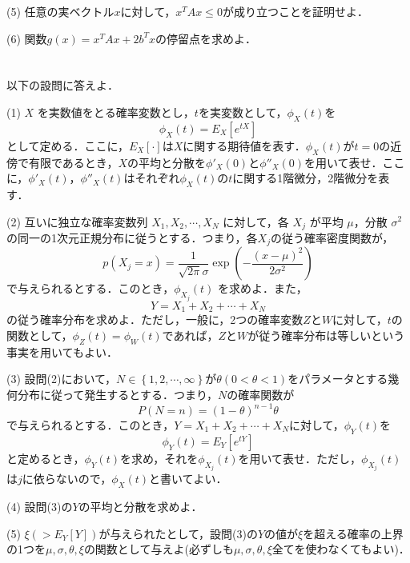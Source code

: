 \documentclass[a4j]{jarticle}
\begin{document}
\begin{screen}
 (5) 任意の実ベクトル$x$に対して，$x^TAx \leq 0$が成り立つことを証明せよ．
\end{screen}

\begin{screen}
 (6) 関数$g(x)=x^TAx + 2b^Tx$の停留点を求めよ．
\end{screen}

\section{}


\section{}

\begin{screen}
 以下の設問に答えよ．
\end{screen}

\begin{screen}
 (1) $X$ を実数値をとる確率変数とし，$t$を実変数として，$\phi_X(t)$を
 $$\phi_X(t) = E_X\left[e^{tX}\right]$$
 として定める．ここに，$E_X\left[\cdot\right]$は$X$に関する期待値を表す．$\phi_X(t)$が$t=0$の近傍で有限であるとき，$X$の平均と分散を$\phi'_X(0)$と$\phi''_X(0)$を用いて表せ．ここに，$\phi'_X(t)$，$\phi''_X(t)$はそれぞれ$\phi_X(t)$の$t$に関する1階微分，2階微分を表す．
\end{screen}

\begin{screen}
 (2) 互いに独立な確率変数列 $X_1,X_2,\cdots,X_N$ に対して，各 $X_j$ が平均 $\mu$，分散 $\sigma^2$ の同一の1次元正規分布に従うとする．つまり，各$X_j$の従う確率密度関数が，
 $$p(X_j=x) = \frac{1}{\sqrt{2 \pi}\sigma}\exp\left(- \frac{(x-\mu)^2}{2\sigma^2}\right)$$
 で与えられるとする．このとき，$\phi_{X_j}(t)$ を求めよ．また，
 $$ Y = X_1 + X_2 + \cdots + X_N$$
 の従う確率分布を求めよ．ただし，一般に，2つの確率変数$Z$と$W$に対して，$t$の関数として，$\phi_Z(t)=\phi_W(t)$であれば，$Z$と$W$が従う確率分布は等しいという事実を用いてもよい．
\end{screen}

\begin{screen}
 (3) 設問(2)において，$N\in \left\{1,2,\cdots,\infty\right\}$が$\theta(0<\theta<1)$をパラメータとする幾何分布に従って発生するとする．つまり，$N$の確率関数が
 $$P(N=n) = (1-\theta)^{n-1}\theta$$
 で与えられるとする．このとき，$Y=X_1+X_2+\cdots+X_N$に対して，$\phi_Y(t)$を
 $$\phi_Y(t) = E_Y\left[e^{tY}\right]$$
 と定めるとき，$\phi_Y(t)$を求め，それを$\phi_{X_j}(t)$を用いて表せ．ただし，$\phi_{X_j}(t)$は$j$に依らないので，$\phi_X(t)$と書いてよい．
\end{screen}

\begin{screen}
 (4) 設問(3)の$Y$の平均と分散を求めよ．
\end{screen}

\begin{screen}
 (5) $\xi(>E_Y\left[Y\right])$が与えられたとして，設問(3)の$Y$の値が$\xi$を超える確率の上界の1つを$\mu,\sigma,\theta,\xi$の関数として与えよ(必ずしも$\mu,\sigma,\theta,\xi$全てを使わなくてもよい)．
\end{screen}
\end{document}
